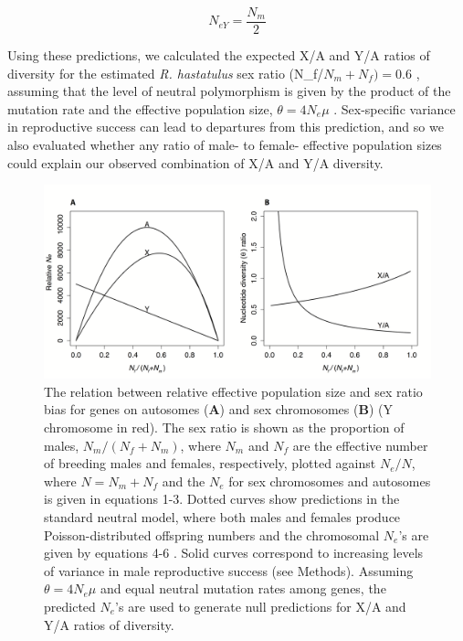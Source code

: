 \documentclass[9pt,twocolumn,twoside]{gsajnl}
\begin{document}
\begin{equation}
N_{e{Y}} = \frac{N_{m}}{2}\label{eq:NeY}
\end{equation}

 Using these predictions, we calculated the expected X/A and Y/A ratios of diversity for the estimated \textit{R. hastatulus} sex ratio (N_{f}/$N_{m}+N_{f})=0.6$ \citep{pickup2013influence}, assuming that the level of neutral polymorphism is given by the product of the mutation rate and the effective population size, $\theta=4N_{e}\mu$ \citep{watterson1975}. Sex-specific variance in reproductive success can lead to departures from this prediction, and so we also evaluated whether any ratio of male- to female- effective population sizes could explain our observed combination of X/A and Y/A diversity. 
 
 
 
\begin{figure}[htbp]
\centering
\includegraphics[width=\linewidth]{Figure1.png}
\caption{The relation between relative effective population size and sex ratio bias for genes on autosomes (\textbf{A}) and sex chromosomes (\textbf{B}) (Y chromosome in red). The sex ratio is shown as the proportion of males, $N_{m}/(N_{f}+N_{m})$, where $N_{m}$ and $N_{f}$ are the effective number of breeding males and females, respectively, plotted against $N_{e}/N$, where $N=N_{m}+N_{f}$ and the $N_{e}$ for sex chromosomes and autosomes is given in equations 1-3. Dotted curves show predictions in the standard neutral model, where both males and females produce Poisson-distributed offspring numbers and the chromosomal $N_{e}$'s are given by equations 4-6 \citep{wright1931evolution}. Solid curves correspond to increasing levels of variance in male reproductive success \citep{nomura2002effective} (see Methods). Assuming $\theta=4N_{e}\mu$ and equal neutral mutation rates among genes, the predicted $N_{e}$'s are used to generate null predictions for X/A and Y/A ratios of diversity.
}
\label{fig:spectrum}
\end{figure}
\end{document}

